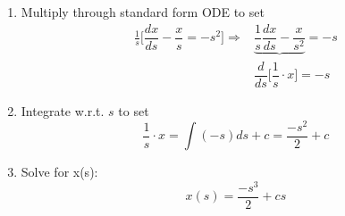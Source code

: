 \begin{enumerate}[label=\protect\circled{\Roman*}]
	\begin{enumerate}[label=\textbf{Step \arabic*:}]
	\setlength{\itemindent}{1.3in}
	\item Multiply through standard form ODE to set
	\begin{align*}
		\frac{1}{s}\bigg[\dfrac{dx}{ds} - \dfrac{x}{s} = -s^2 \bigg] \Rightarrow & \underbrace{\dfrac{1}{s} \dfrac{dx}{ds} - \dfrac{x}{s^2}} = -s\\
		& \dfrac{d}{ds}\bigg[\dfrac{1}{s} \cdot x \bigg] = -s
	\end{align*}
	\item Integrate w.r.t. $s$ to set
	\begin{equation*}
		\dfrac{1}{s}\cdot x = \int (-s)ds + c = \dfrac{-s^2}{2} + c
	\end{equation*}
	\item Solve for x(s):
	\begin{equation*}
		\boxed{x(s) = \dfrac{-s^3}{2} + cs}
	\end{equation*}
	\end{enumerate}
\end{enumerate}
